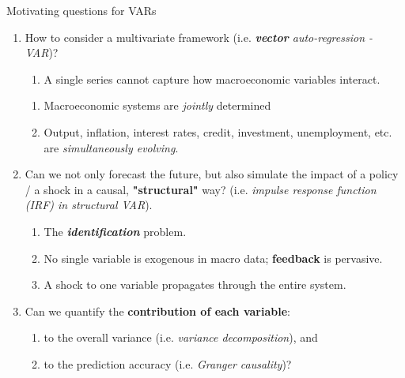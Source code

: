 \documentclass{beamer}
\begin{document}
\begin{frame}{Motivating questions for VARs}

\begin{enumerate}
    \item How to consider a multivariate framework (i.e. \textit{\textbf{vector} auto-regression - VAR})? 
    \begin{enumerate}
        \item  A single series cannot capture how macroeconomic variables interact.
    \end{enumerate}
    \begin{enumerate}

        \item Macroeconomic systems are \textit{jointly} determined
        \item Output, inflation, interest rates, credit, investment, unemployment, etc. are \emph{simultaneously evolving}.  
    \end{enumerate}
    \pause
    \item Can we not only forecast the future, but also simulate the impact of a policy / a shock in a causal, \textbf{"structural"} way? (i.e. \textit{impulse response function (IRF) in structural VAR}). 
    \begin{enumerate}
        \item The \textit{\textbf{identification}} problem.
        \item No single variable is exogenous in macro data; \textbf{feedback} is pervasive.
    \item A shock to one variable propagates through the entire system.
    \end{enumerate}
        \pause
    \item Can we quantify the \textbf{contribution of each variable}:
    \begin{enumerate}
        \item  to the overall variance (i.e. \textit{variance decomposition}), and 
        \item to the prediction accuracy (i.e.\textit{ Granger causality})?
    \end{enumerate}
\end{enumerate}
\end{frame}
\end{document}
